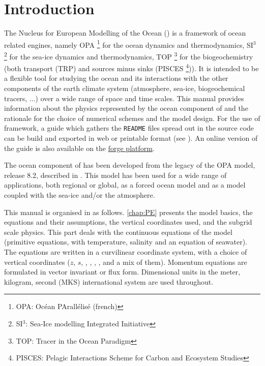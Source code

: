 \documentclass[../main/NEMO_manual]{subfiles}
\begin{document}

\chapter{Introduction}

The Nucleus for European Modelling of the Ocean (\NEMO) is a framework of ocean related engines,
namely OPA \footnote{OPA: Oc\'{e}an PArall\'{e}lis\'{e} (french)} for the ocean dynamics and thermodynamics,
SI$^3$ \footnote{SI$^3$: Sea-Ice modelling Integrated Initiative} for the sea-ice dynamics and thermodynamics,
TOP \footnote{TOP: Tracer in the Ocean Paradigm} for the biogeochemistry 
(both transport (TRP) and sources minus sinks 
(PISCES \footnote{PISCES: Pelagic Interactions Scheme for Carbon and Ecosystem Studies})).
It is intended to be a flexible tool for studying the ocean and its interactions with the other components of
the earth climate system (atmosphere, sea-ice, biogeochemical tracers, ...) over
a wide range of space and time scales.
This manual provides information about the physics represented by the ocean component of \NEMO and
the rationale for the choice of numerical schemes and the model design.
For the use of framework, 
a guide which gathers the \texttt{README} files spread out in the source code can be build and 
exported in web or printable format (see ).
An online version of the guide is also available on the 
\href{http://forge.ipsl.jussieu.fr/nemo}{\NEMO forge platform}.

The ocean component of \NEMO has been developed from the legacy of the OPA model, release 8.2, 
described in \citet{madec.delecluse.ea_NPM98}.
This model has been used for a wide range of applications, both regional or global, as a forced ocean model and 
as a model coupled with the sea-ice and/or the atmosphere.

This manual is organised in as follows.
\autoref{chap:PE} presents the model basics, \ie the equations and their assumptions,
the vertical coordinates used, and the subgrid scale physics.
This part deals with the continuous equations of the model
(primitive equations, with temperature, salinity and an equation of seawater).
The equations are written in a curvilinear coordinate system, with a choice of vertical coordinates
($z$, $s$, \zstar, \sstar, \ztilde, \stilde, and a mix of them).
Momentum equations are formulated in vector invariant or flux form.
Dimensional units in the meter, kilogram, second (MKS) international system are used throughout.
\end{document}
